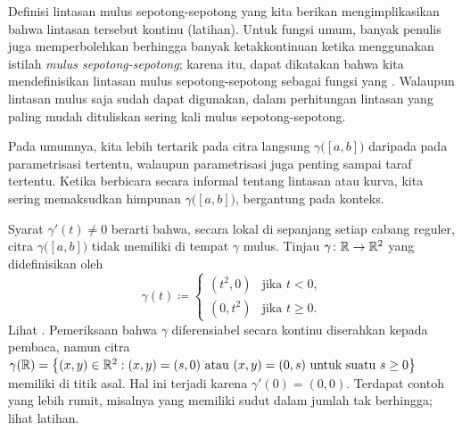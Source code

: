 Definisi lintasan mulus sepotong-sepotong yang kita berikan mengimplikasikan
bahwa lintasan tersebut kontinu (latihan).  Untuk fungsi umum, banyak penulis juga
memperbolehkan berhingga banyak ketakkontinuan ketika menggunakan istilah \emph{mulus
sepotong-sepotong}; karena itu, dapat dikatakan bahwa kita mendefinisikan lintasan mulus
sepotong-sepotong sebagai fungsi yang \emph{}.
Walaupun lintasan mulus saja sudah dapat digunakan, dalam perhitungan lintasan
yang paling mudah dituliskan sering kali mulus sepotong-sepotong.

Pada umumnya, kita lebih tertarik pada citra langsung $\gamma\bigl([a,b]\bigr)$
daripada pada parametrisasi tertentu, walaupun parametrisasi juga
penting sampai taraf tertentu.  Ketika berbicara secara informal tentang lintasan atau kurva,
kita sering memaksudkan himpunan $\gamma\bigl([a,b]\bigr)$, bergantung
pada konteks.


\begin{example}
Syarat $\gamma'(t) \neq 0$ berarti bahwa, secara lokal di sepanjang setiap cabang reguler, citra
$\gamma\bigl([a,b]\bigr)$
tidak memiliki  di tempat $\gamma$ mulus.
Tinjau $\gamma \colon {\mathbb{R}} \to {\mathbb{R}}^2$ yang didefinisikan oleh
\begin{equation*}
\gamma(t) \coloneqq
\begin{cases}
(t^2,0) & \text{jika } t < 0,\\
(0,t^2) & \text{jika } t \geq 0.
\end{cases}
\end{equation*}
Lihat .
Pemeriksaan bahwa $\gamma$ diferensiabel secara kontinu diserahkan kepada pembaca,
namun citra $\gamma({\mathbb{R}}) = \bigl\{ (x,y) \in {\mathbb{R}}^2 : (x,y) =
(s,0) \text{ atau } (x,y) = (0,s) \text{ untuk suatu } s \geq 0 \bigr\}$ memiliki
 di titik asal.  Hal ini terjadi karena $\gamma'(0) = (0,0)$.
Terdapat contoh yang lebih rumit, misalnya yang memiliki sudut dalam jumlah tak berhingga;
lihat latihan.
\begin{myfigureht}
\caption{Lintasan  yang memiliki sudut jika turunan yang bernilai nol diizinkan.  Titik-titik
yang bersesuaian dengan beberapa nilai
$t$ ditandai dengan noktah.\label{fig:cornersmoothpath}}
\end{myfigureht}
\end{example}

